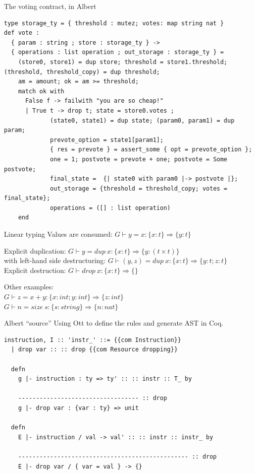 \documentclass[aspectratio=169]{beamer}
\begin{document}
\begin{frame}[fragile]{The voting contract, in Albert}
\begin{lstlisting}[language=albert,basicstyle=\footnotesize]
type storage_ty = { threshold : mutez; votes: map string nat }
def vote :
  { param : string ; store : storage_ty } ->
  { operations : list operation ; out_storage : storage_ty } =
    (store0, store1) = dup store; threshold = store1.threshold; (threshold, threshold_copy) = dup threshold;
    am = amount; ok = am >= threshold;
    match ok with
      False f -> failwith "you are so cheap!"
      | True t -> drop t; state = store0.votes ;
             (state0, state1) = dup state; (param0, param1) = dup param;
             prevote_option = state1[param1];
             { res = prevote } = assert_some { opt = prevote_option };
             one = 1; postvote = prevote + one; postvote = Some postvote;
             final_state =  {| state0 with param0 |-> postvote |};
             out_storage = {threshold = threshold_copy; votes = final_state};
             operations = ([] : list operation)
    end
\end{lstlisting}
\end{frame}

\begin{frame}{Linear typing}
  Values are consumed: $G \vdash y = x : \{ x : t \} \Rightarrow \{ y : t \} $

  Explicit duplication: $G \vdash y = dup\:x : \{ x : t \} \Rightarrow \{ y : (t \times t) \}$\\
  with left-hand side destructuring: $G \vdash (y, z) = dup\:x : \{ x : t \} \Rightarrow \{ y : t; z : t \}$\\
  Explicit destruction: $G \vdash drop\:x : \{ x : t \} \Rightarrow \{\}$

  Other examples:\\
  $G \vdash z = x + y : \{ x : int ; y : int \} \Rightarrow \{ z : int \}$\\
  $G \vdash n = size\:s : \{ s : string \} \Rightarrow \{ n : nat \}$
\end{frame}

\begin{frame}[fragile]{Albert ``source''}
  Using Ott to define the rules and generate AST in Coq.
  {\footnotesize
\begin{verbatim}
instruction, I :: 'instr_' ::= {{com Instruction}}
  | drop var :: :: drop {{com Resource dropping}}

  defn
    g |- instruction : ty => ty' :: :: instr :: T_ by

    ---------------------------------- :: drop
    g |- drop var : {var : ty} => unit

  defn
    E |- instruction / val -> val' :: :: instr :: instr_ by

    ------------------------------------------------ :: drop
    E |- drop var / { var = val } -> {}
\end{verbatim}}
\end{frame}
\end{document}
